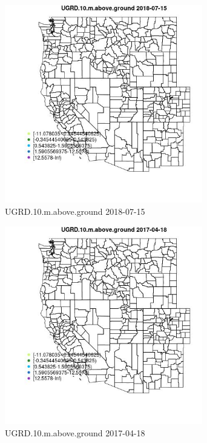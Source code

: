 \begin{figure} 
\centering  
\includegraphics[width=0.77\textwidth]{Code_Outputs/Report_ML_input_PM25_Step4_part_e_de_duplicated_aveswNAs_MapObsUGRD10maboveground2018-07-15.jpg} 
\caption{\label{fig:Report_ML_input_PM25_Step4_part_e_de_duplicated_aveswNAsMapObsUGRD10maboveground2018-07-15}UGRD.10.m.above.ground 2018-07-15} 
\end{figure} 
 

\begin{figure} 
\centering  
\includegraphics[width=0.77\textwidth]{Code_Outputs/Report_ML_input_PM25_Step4_part_e_de_duplicated_aveswNAs_MapObsUGRD10maboveground2017-04-18.jpg} 
\caption{\label{fig:Report_ML_input_PM25_Step4_part_e_de_duplicated_aveswNAsMapObsUGRD10maboveground2017-04-18}UGRD.10.m.above.ground 2017-04-18} 
\end{figure} 
 

